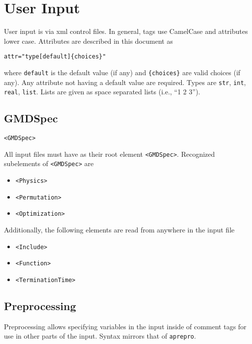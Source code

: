 \documentclass[11pt]{report}
\newcommand{\tag}[1]{\texttt{<#1>}}
\begin{document}
\chapter{User Input}
User input is via xml control files. In general, tags use CamelCase and
attributes lower case.  Attributes are described in this document as
%
\begin{verbatim}
attr="type[default]{choices}"
\end{verbatim}
%
where \texttt{default} is the default value (if any) and \texttt{\{choices\}}
are valid choices (if any). Any attribute not having a default value are
required. Types are \texttt{str}, \texttt{int}, \texttt{real}, \texttt{list}.
Lists are given as space separated lists (i.e., ``1 2 3'').


\section{GMDSpec}
\begin{verbatim}
<GMDSpec>
\end{verbatim}
%
All input files must have as their root element \tag{GMDSpec}. Recognized
subelements of \tag{GMDSpec} are
%
\begin{itemize}
  \item \tag{Physics}
  \item \tag{Permutation}
  \item \tag{Optimization}
\end{itemize}

Additionally, the following elements are read from anywhere in the input file
%
\begin{itemize}
  \item \tag{Include}
  \item \tag{Function}
  \item \tag{TerminationTime}
\end{itemize}

\section{Preprocessing}
Preprocessing allows specifying variables in the input inside of comment tags
for use in other parts of the input. Syntax mirrors that of \texttt{aprepro}.
\end{document}

